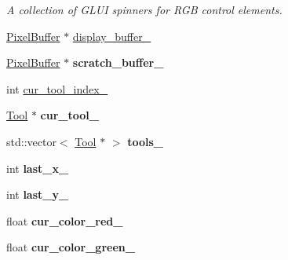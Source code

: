 \begin{DoxyCompactItemize}
\begin{tabbing}
\end{tabbing}\begin{DoxyCompactList}\small\item\em A collection of G\+L\+UI spinners for R\+GB control elements. \end{DoxyCompactList}\item 
\hyperlink{classimage__tools_1_1PixelBuffer}{Pixel\+Buffer} $\ast$ \hyperlink{classimage__tools_1_1FlashPhotoApp_ad0a08d5606cfc5aa02412303147c612d}{display\+\_\+buffer\+\_\+}
\item 
\hyperlink{classimage__tools_1_1PixelBuffer}{Pixel\+Buffer} $\ast$ {\bfseries scratch\+\_\+buffer\+\_\+}\hypertarget{classimage__tools_1_1FlashPhotoApp_acab0f2d92c8258bcd3c5c2ab73cf78a2}{}\label{classimage__tools_1_1FlashPhotoApp_acab0f2d92c8258bcd3c5c2ab73cf78a2}

\item 
int \hyperlink{classimage__tools_1_1FlashPhotoApp_a7117f202caa8a103789b7b0ceb7068d5}{cur\+\_\+tool\+\_\+index\+\_\+}
\item 
\hyperlink{classTool}{Tool} $\ast$ {\bfseries cur\+\_\+tool\+\_\+}\hypertarget{classimage__tools_1_1FlashPhotoApp_a545fbd882ec8e96290bb68d623cb50c7}{}\label{classimage__tools_1_1FlashPhotoApp_a545fbd882ec8e96290bb68d623cb50c7}

\item 
std\+::vector$<$ \hyperlink{classTool}{Tool} $\ast$ $>$ {\bfseries tools\+\_\+}\hypertarget{classimage__tools_1_1FlashPhotoApp_a65af6e1e1747fa4cc9e5fdaeb82bd073}{}\label{classimage__tools_1_1FlashPhotoApp_a65af6e1e1747fa4cc9e5fdaeb82bd073}

\item 
int {\bfseries last\+\_\+x\+\_\+}\hypertarget{classimage__tools_1_1FlashPhotoApp_a26c2e49b110d8d52c301b8590513b307}{}\label{classimage__tools_1_1FlashPhotoApp_a26c2e49b110d8d52c301b8590513b307}

\item 
int {\bfseries last\+\_\+y\+\_\+}\hypertarget{classimage__tools_1_1FlashPhotoApp_abf9e3040393fc92a867142f7f091ea95}{}\label{classimage__tools_1_1FlashPhotoApp_abf9e3040393fc92a867142f7f091ea95}

\item 
float {\bfseries cur\+\_\+color\+\_\+red\+\_\+}\hypertarget{classimage__tools_1_1FlashPhotoApp_a1f05e2dcc771bb2b915fe5713cafd06c}{}\label{classimage__tools_1_1FlashPhotoApp_a1f05e2dcc771bb2b915fe5713cafd06c}

\item 
float {\bfseries cur\+\_\+color\+\_\+green\+\_\+}\hypertarget{classimage__tools_1_1FlashPhotoApp_a06056579211bf21a52db97fdd9cd1729}{}\label{classimage__tools_1_1FlashPhotoApp_a06056579211bf21a52db97fdd9cd1729}


\end{DoxyCompactItemize}
